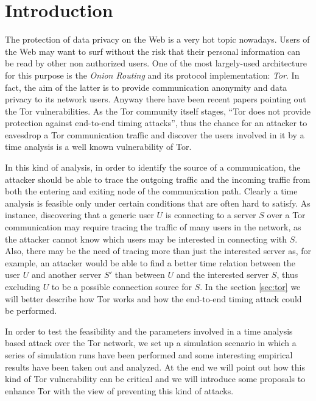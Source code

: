 \section{Introduction}
The protection of data privacy on the Web is a very hot topic nowadays. 
Users of the Web may want to surf without the risk that their personal
information can be read by other non authorized users. 
One of the most largely-used
architecture for this purpose is the \emph{Onion Routing} and its
protocol implementation: \emph{Tor}\cite{dingledine2004tor}. 
In fact, the aim of the latter is to provide communication anonymity and
data privacy to its network users. Anyway there have been recent papers
 pointing out the Tor vulnerabilities\cite{salo2010recent}.
 As the Tor community itself stages, ``Tor does not provide protection
 against end-to-end timing attacks''\cite{toroverview}, thus the
 chance for an attacker to eavesdrop a Tor communication traffic and
 discover the users involved in it by a
 time analysis is a well known vulnerability of Tor. 
 
 In this kind of analysis, in order to
 identify the source of a communication, the attacker should be able to
 trace the outgoing traffic and the incoming traffic from both the
 entering and exiting node of the communication path.
 Clearly a time analysis is feasible only under certain 
 conditions that are often hard to satisfy. As instance, discovering
 that a generic user $U$ is connecting to a server $S$ over a Tor
 communication may require tracing the traffic of many users in the
 network, as the
 attacker cannot know which users may be interested in connecting with
 $S$. Also, there may be the need of tracing more than just the
 interested server as, for example, an attacker would be able to find a better time
 relation between the user $U$ and another server $S'$ than between $U$
 and the interested server $S$, thus excluding $U$ to be a possible
 connection source for $S$.
 In the section
 \ref{sec:tor} we will better describe how Tor works and how the
 end-to-end timing attack could be performed.
 
 In order to test the feasibility and the parameters involved in
 a time analysis based attack over the Tor network, we set up a simulation
 scenario in which a series of simulation runs have been performed and some interesting
 empirical results have been taken out and analyzed.
 At the end we will point out how this kind of Tor vulnerability can be
 critical and we will introduce some proposals to enhance Tor with the
 view of preventing this kind of attacks.
